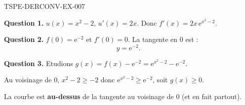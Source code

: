 \begin{corrige}{TSPE-DERCONV-EX-007}

\textbf{Question 1.} $u(x) = x^2-2$, $u'(x) = 2x$. Donc $f'(x) = 2x\,\mathrm{e}^{x^2-2}$.


\textbf{Question 2.} $f(0) = \mathrm{e}^{-2}$ et $f'(0) = 0$. La tangente en $0$ est :
\[ y = \mathrm{e}^{-2}. \]

\textbf{Question 3.} Etudions $g(x) = f(x) - \mathrm{e}^{-2} = \mathrm{e}^{x^2-2} - \mathrm{e}^{-2}$.

Au voisinage de $0$, $x^2-2 \geq -2$ donc $\mathrm{e}^{x^2-2} \geq \mathrm{e}^{-2}$, soit $g(x) \geq 0$.

La courbe est \textbf{au-dessus} de la tangente au voisinage de $0$ (et en fait partout).

\end{corrige}
